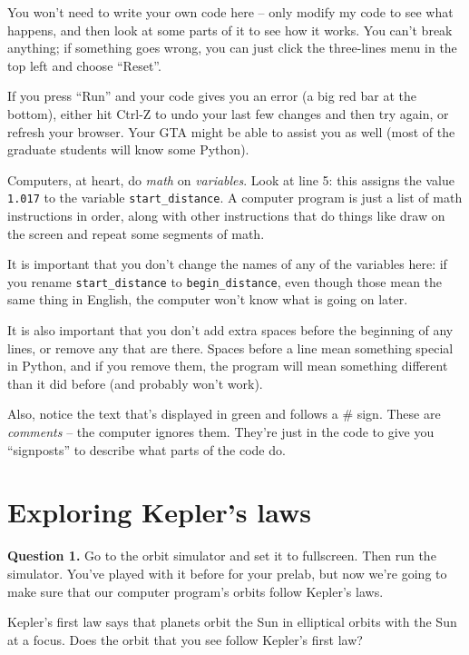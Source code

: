 \documentclass[11pt]{article}
\begin{document}
You won't need to write your own code here -- only modify my code to see what happens, and then look at some parts of it to see how it works. You can't break anything; if something goes wrong, you can just click the three-lines menu in the top left and choose ``Reset''.

If you press ``Run'' and your code gives you an error (a big red bar at the bottom), either hit Ctrl-Z to undo your last few changes and then try again, or refresh your browser. Your GTA might be able to assist you as well (most of the graduate students will know some Python). 

Computers, at heart, do {\it math} on {\it variables}. Look at line 5: this assigns the value {\tt 1.017} to the variable {\tt start\_distance}. A computer program is just a list of math instructions in order, along with other instructions that do things like draw on the screen and repeat some segments of math.

It is important that you don't change the names of any of the variables here: if you rename {\tt start\_distance} to {\tt begin\_distance}, even though those mean the same thing in English, the computer won't know what is going on later.

It is also important that you don't add extra spaces before the beginning of any lines, or remove any that are there. Spaces before a line mean something special in Python, and if you remove them, the program will mean something different than it did before (and probably won't work).

Also, notice the text that's displayed in green and follows a \# sign. These are {\it comments} -- the computer ignores them. They're just in the code to give you ``signposts'' to describe what parts of the code do.



\newpage

\section{Exploring Kepler's laws}

\textbf{Question 1.} Go to the orbit simulator and set it to fullscreen. Then run the simulator. You've played with it before for your prelab, but now we're going to make sure that our computer program's orbits follow Kepler's laws. 

Kepler's first law says that planets orbit the Sun in elliptical orbits with the Sun at a focus. Does the orbit that you see follow Kepler's first law?
\end{document}
